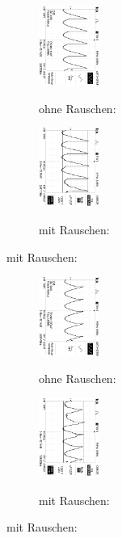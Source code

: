 \begin{figure}
\caption{$U_{out} (\phi = 135°$)}
\begin{subfigure}{0.48\textwidth}
\centering
\caption*{ohne Rauschen:}
\includegraphics[angle=90,height=2.6cm]{graphics/ALL0032/F0032TEK.jpg}
\label{fig:phi135o}
\end{subfigure}
\begin{subfigure}{0.48\textwidth}
\centering
\caption*{mit Rauschen:}
\includegraphics[angle=90,height=2.6cm]{graphics/ALL0040/F0040TEK.jpg}
\label{fig:phi135m}
\end{subfigure}
\end{figure}
\addtocounter{figure}{-1}
\begin{figure}
\caption{$U_{out} (\phi = 180°$) }
\begin{subfigure}{0.48\textwidth}
\centering
\caption*{ohne Rauschen:}
\includegraphics[angle=90,height=2.6cm]{graphics/ALL0034/F0034TEK.jpg}
\label{fig:phi180o}
\end{subfigure}
\begin{subfigure}{0.48\textwidth}
\centering
\caption*{mit Rauschen:}
\includegraphics[angle=90,height=2.6cm]{graphics/ALL0042/F0042TEK.jpg}
\label{fig:phi180m}
\end{subfigure}
\end{figure}
\addtocounter{figure}{-1}
